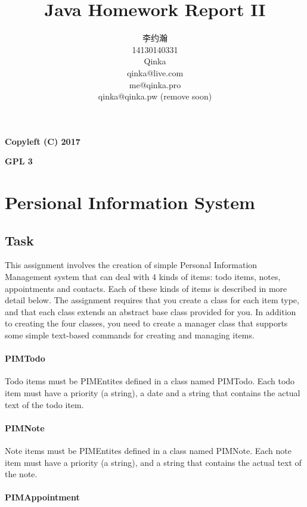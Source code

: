 \documentclass{article}
\title{Java Homework Report II}
\author{李约瀚 \\ 14130140331 \\ Qinka \\ qinka@live.com \\ me@qinka.pro \\ qinka@qinka.pw (remove soon)}
\begin{document}
\maketitle
\newpage

{\Huge \textbf{Copyleft (C) 2017}}
\par
{\Huge \textbf{GPL 3}}
\newpage

\tableofcontent
\newpage

\section{Persional Information System}
\label{sec:pim}

\subsection{Task}
\label{sec:pim:task}

This assignment involves the creation of simple Personal Information Management system that can deal with 4 kinds of items:
todo items, notes, appointments and contacts. Each of these kinds of items is described in more detail below.
The assignment requires that you create a class for each item type, and that each class extends an abstract base class provided for you.
In addition to creating the four classes, you need to create a manager class that supports some simple text-based commands
for creating and managing items.

\paragraph{PIMTodo}

Todo items must be PIMEntites defined in a class named PIMTodo. Each todo item must have a priority (a string),
a date and a string that contains the actual text of the todo item.

\paragraph{PIMNote}

Note items must be PIMEntites defined in a class named PIMNote. Each note item must have a priority (a string),
and a string that contains the actual text of the note.

\paragraph{PIMAppointment}
\end{document}
